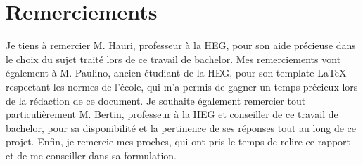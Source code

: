 \documentclass[12pt]{article}
\let\stdsection\section
\renewcommand{\section}{\clearpage\stdsection}
\begin{document}
\section{Remerciements}
Je tiens à remercier M. Hauri, professeur à la HEG, pour son aide précieuse dans le choix du sujet traité lors de ce travail de bachelor.
\newline\newline
Mes remerciements vont également à M. Paulino, ancien étudiant de la HEG, pour son template LaTeX respectant les normes de l'école, qui m'a permis de gagner un temps précieux lors de la rédaction de ce document.
\newline\newline
Je souhaite également remercier tout particulièrement M. Bertin, professeur à la HEG et conseiller de ce travail de bachelor, pour sa disponibilité et la pertinence de ses réponses tout au long de ce projet.
\newline\newline
Enfin, je remercie mes proches, qui ont pris le temps de relire ce rapport et de me conseiller dans sa formulation.
\newpage
\end{document}
